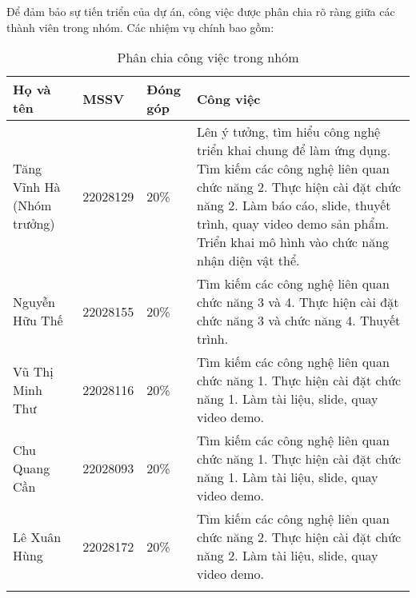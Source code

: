 \documentclass[a4paper,12pt]{article}
\begin{document}
Để đảm bảo sự tiến triển của dự án, công việc được phân chia rõ ràng giữa các thành viên trong nhóm. Các nhiệm vụ chính bao gồm:

\renewcommand{\arraystretch}{1.5} %

\setlength{\LTleft}{0pt}
\setlength{\LTright}{0pt}

\small
\begin{longtable}{|l|l|l|p{6cm}|}
\hline
\textbf{Họ và tên}           & \textbf{MSSV} & \textbf{Đóng góp} & \textbf{Công việc}                                                                                                     \\ \hline
Tăng Vĩnh Hà (Nhóm trưởng) & 22028129      & 20\%              & 
Lên ý tưởng, tìm hiểu công nghệ triển khai chung để làm ứng dụng. \newline
Tìm kiếm các công nghệ liên quan chức năng 2. \newline
Thực hiện cài đặt chức năng 2. \newline
Làm báo cáo, slide, thuyết trình, quay video demo sản phẩm. \newline
Triển khai mô hình vào chức năng nhận diện vật thể. \\ \hline

Nguyễn Hữu Thế              & 22028155      & 20\%              & 
Tìm kiếm các công nghệ liên quan chức năng 3 và 4. \newline
Thực hiện cài đặt chức năng 3 và chức năng 4. \newline
Thuyết trình. \\ \hline

Vũ Thị Minh Thư           & 22028116      & 20\%              & 
Tìm kiếm các công nghệ liên quan chức năng 1. \newline
Thực hiện cài đặt chức năng 1. \newline
Làm tài liệu, slide, quay video demo. \\ \hline

Chu Quang Cần             & 22028093      & 20\%              & 
Tìm kiếm các công nghệ liên quan chức năng 1. \newline
Thực hiện cài đặt chức năng 1. \newline
Làm tài liệu, slide, quay video demo. \\ \hline

Lê Xuân Hùng             & 22028172      & 20\%              & 
Tìm kiếm các công nghệ liên quan chức năng 2. \newline
Thực hiện cài đặt chức năng 2. \newline
Làm tài liệu, slide, quay video demo. \\ \hline

\caption{Phân chia công việc trong nhóm}
\label{table:phan_chia_cong_viec}
\end{longtable}
\end{document}
